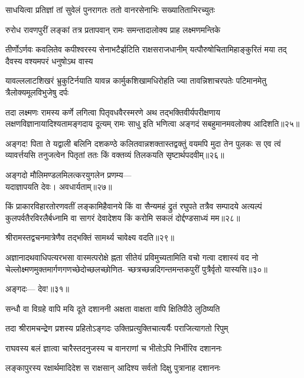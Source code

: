 \twolineshloka
{साधयित्वा प्रतिज्ञां तां सुवेलं पुनरागतः}
{ततो वानरसेनाभिः सख्यातिताभिरच्युतः} %

\twolineshloka
{रुरोध रावणपुरीं लङ्कां तत्र प्रतापवान्}
{रामः समन्तादालोक्य प्राह लक्ष्मणमन्तिके} %

\fourlineindentedshloka
{तीर्णोऽर्णवः कवलितेव कपीश्वरस्य}
{सेनाभटैर्झटिति राक्षसराजधानीम्}
{यत्पौरुषोचितामिहाङ्कुरितं मया तद्}
{दैवस्य वश्यमपरं धनुषोऽथ वास्य} %


\fourlineindentedshloka
{यावल्ललाटशिखरं भ्रुकुटिर्नयाति}
{यावन्न कार्मुकशिखामधिरोहति ज्या}
{तावन्निशाचरपतेः पटिमानमेतु}
{त्रैलोक्यमूलविभुजेषु दर्पः} %


तदा लक्ष्मणः रामस्य कर्णे लगित्वा पितृवधवैरस्मरणे अथ 
तद्भक्तिवीर्यपरीक्षणाय लक्षणविज्ञानायादिश्यतामङ्गदाय दूत्यम्
रामः साधु इति भणित्वा अङ्गदं सबहुमानमवलोक्य आदिशति॥२५॥

अङ्गद! पिता ते यद्वाली बलिनि दशकण्ठे
कलितवान्नशक्तास्तद्वक्तुं वयमपि मुदा तेन पुलकः
स एव त्वं व्यावर्त्तयसि तनुजत्वेन पितृतां 
ततः किं वक्तव्यं तिलकयति सृष्टार्थपदवीम्॥२६॥

अङ्गदो मौलिमण्डलमिलत्करयुगलेन प्रणम्य---\\
यदाज्ञापयति देवः। अवधार्यताम्॥२७॥

किं प्राकारविहारतोरणवतीं लङ्कामिहैवानये
किं वा सैन्यमहं द्रुतं रघुपते तत्रैव सम्पादये
अत्यल्पं कुलपर्वतैरविरलैर्बध्नामि वा सागरं
देवादेशय किं करोमि सकलं दोर्द्दण्डसाध्यं मम॥२८॥

श्रीरामस्तद्वचनमात्रेणैव तद्भक्तिं सामर्थ्य चावेक्ष्य वदति॥२९॥

अज्ञानादथवाधिपत्यरभसा वास्मत्परोक्षे ह्नता सीतेयं
प्रविमुच्यतामिति वचो गत्वा दशास्यं वद
नो चेल्लोक्ष्मणमुक्तमार्गणगणच्छेदोच्छलच्छोणित-
च्छत्रच्छन्नदिगन्तमन्तकपुरीं पुत्रैर्वृतो यास्यसि॥३०॥

अङ्गदः--- देव!॥३१॥

\addtocounter{shlokacount}{7}
\twolineshloka
{सन्धौ वा विग्रहे वापि मयि दूते दशाननी}
{अक्षता वाक्षता वापि क्षितिपीठे लुठिष्यति} %

\twolineshloka
{तदा श्रीरामचन्द्रेण प्रशस्य प्रहितोऽङ्गदः}
{उक्तिप्रत्युक्तिचात्यर्यैः पराजित्यागतो रिपुम्} %

\twolineshloka
{राघवस्य बलं ज्ञात्वा चारैस्तदनुजस्य च}
{वानराणां च भीतोऽपि निर्भीरिव दशाननः} %

\twolineshloka
{लङ्कापुरस्य रक्षार्थमादिदेश स राक्षसान्}
{आदिश्य सर्वतो दिक्षु पुत्रानाह दशाननः} %

